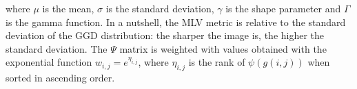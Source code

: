 \noindent where $\mu$ is the mean, $\sigma$ is the standard deviation, $\gamma$ is the shape parameter and $\Gamma$ is the gamma function. In a nutshell, the MLV metric is relative to the standard deviation of the GGD distribution: the sharper the image is, the higher the standard deviation. The $\Psi$ matrix is weighted with values obtained with the exponential function $w_{i,j} = e^{\eta_{i,j}}$, where $\eta_{i,j}$ is the rank of $\psi(g(i,j))$ when sorted in ascending order.